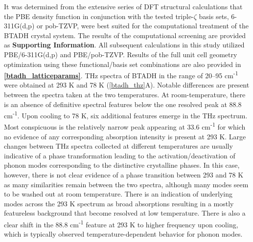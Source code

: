 It was determined from the extensive series of DFT structural calculations that the PBE density function in conjunction with the tested triple-\(\zeta\) basis sets, 6-311G(d,p) or pob-TZVP, were best suited for the computational treatment of the BTADH crystal system. The results of the computational screening are provided as \textbf{Supporting Information}. All subsequent calculations in this study utilized PBE/6-311G(d,p) and PBE/pob-TZVP. Results of the full unit cell geometry optimization using these functional/basis set combinations are also provided in \textbf{\autoref{btadh_latticeparams}}.
THz spectra of BTADH in the range of 20–95 cm\textsuperscript{-1} were obtained at 293 K and 78 K (\autoref{btadh_thz}A). Notable differences are present between the spectra taken at the two temperatures. At room-temperature, there is an absence of definitive spectral features below the one resolved peak at 88.8 cm\textsuperscript{-1}. Upon cooling to 78 K, six additional features emerge in the THz spectrum. Most conspicuous is the relatively narrow peak appearing at 33.6 cm\textsuperscript{-1} for which no evidence of any corresponding absorption intensity is present at 293 K. Large changes between THz spectra collected at different temperatures are usually indicative of a phase transformation leading to the activation/deactivation of phonon modes corresponding to the distinctive crystalline phases. In this case, however, there is not clear evidence of a phase transition between 293 and 78 K as many similarities remain between the two spectra, although many modes seem to be washed out at room temperature. There is an indication of underlying modes across the 293 K spectrum as broad absorptions resulting in a mostly featureless background that become resolved at low temperature. There is also a clear shift in the 88.8 cm\textsuperscript{-1} feature at 293 K to higher frequency upon cooling, which is typically observed temperature-dependent behavior for phonon modes.

